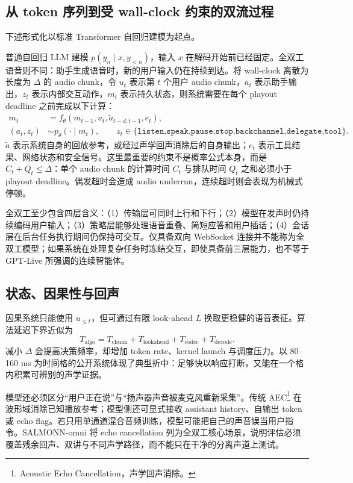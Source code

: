 \documentclass[UTF8,fontset=none,a4paper,10pt]{ctexart}
\begin{document}
\subsection{从 token 序列到受 wall-clock 约束的双流过程}

下述形式化以标准 Transformer 自回归建模为起点\cite{vaswani2017attention}。

普通自回归 LLM 建模 $p(y_n\mid x,y_{<n})$，输入 $x$ 在解码开始前已经固定。全双工语音则不同：助手生成语音时，新的用户输入仍在持续到达。将 wall-clock 离散为长度为 $\Delta$ 的 audio chunk，令 $u_t$ 表示第 $t$ 个用户 audio chunk，$a_t$ 表示助手输出，$z_t$ 表示内部交互动作，$m_t$ 表示持久状态，则系统需要在每个 playout deadline 之前完成以下计算：
\begin{align}
m_t &= f_\theta(m_{t-1},u_t,\tilde a_{t-d:t-1},e_t),\\
(a_t,z_t) &\sim p_\theta(\cdot\mid m_t),\qquad
z_t\in\{\texttt{listen,speak,pause,stop,backchannel,delegate,tool}\}.
\end{align}
$\tilde a$ 表示系统自身的回放参考，或经过声学回声消除后的自身输出；$e_t$ 表示工具结果、网络状态和安全信号。这里最重要的约束不是概率公式本身，而是 $C_t+Q_t\leq\Delta$：单个 audio chunk 的计算时间 $C_t$ 与排队时间 $Q_t$ 之和必须小于 playout deadline。偶发超时会造成 audio underrun，连续超时则会表现为机械式停顿。

全双工至少包含四层含义：（1）传输层可同时上行和下行；（2）模型在发声时仍持续编码用户输入；（3）策略层能够处理语音重叠、简短应答和用户插话；（4）会话层在后台任务执行期间仍保持可交互。仅具备双向 WebSocket 连接并不能称为全双工模型；如果系统在处理复杂任务时冻结交互，即使具备前三层能力，也不等于 GPT-Live 所强调的连续智能体。

\subsection{状态、因果性与回声}

因果系统只能使用 $u_{\le t}$，但可通过有限 look-ahead $L$ 换取更稳健的语音表征。算法延迟下界近似为
\begin{equation}
T_{\mathrm{algo}}=T_{\mathrm{chunk}}+T_{\mathrm{lookahead}}+T_{\mathrm{codec}}+T_{\mathrm{decode}}.
\end{equation}
减小 $\Delta$ 会提高决策频率，却增加 token rate、kernel launch 与调度压力。以 80--160 ms 为时间格的公开系统体现了典型折中：足够快以响应打断，又能在一个格内积累可辨别的声学证据\cite{defossez2024moshi,zhang2026duplexsla}。

模型还必须区分“用户正在说”与“扬声器声音被麦克风重新采集”。传统 AEC\footnote{Acoustic Echo Cancellation，声学回声消除。} 在波形域消除已知播放参考；模型侧还可显式接收 assistant history、自输出 token 或 echo flag。若只用单通道混合音频训练，模型可能把自己的声音误当用户指令。SALMONN-omni 将 echo cancellation 列为全双工核心场景\cite{yu2025salmonnomni}，说明评估必须覆盖残余回声、双讲与不同声学路径，而不能只在干净的分离声道上测试。
\end{document}
